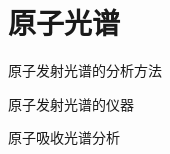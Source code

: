 \chapter{原子光谱}

\begin{introduction}
	\item 原子发射光谱的分析方法
	\item 原子发射光谱的仪器
	\item 原子吸收光谱分析
\end{introduction}

